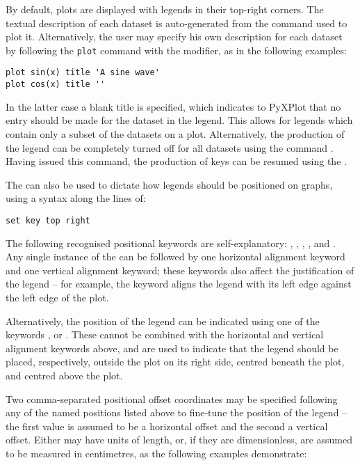 By default, plots are displayed with legends in their top-right corners. The
textual description of each dataset is auto-generated from the command used
to plot it. Alternatively, the user may specify his own description for each
dataset by following the {\tt plot} command with the  modifier,
as in the following examples:

\begin{verbatim}
plot sin(x) title 'A sine wave'
plot cos(x) title ''
\end{verbatim}

In the latter case a blank title is specified, which indicates to PyXPlot that
no entry should be made for the dataset in the legend. This allows for legends
which contain only a subset of the datasets on a plot. Alternatively, the
production of the legend can be completely turned off for all datasets using
the command . Having issued this command, the production of
keys can be resumed using the .

The  can also be used to dictate how legends should be
positioned on graphs, using a syntax along the lines of:

\begin{verbatim}
set key top right
\end{verbatim}

The following recognised positional keywords are self-explanatory:
, , , ,
 and . Any single instance of the
 can be followed by one horizontal alignment keyword and one
vertical alignment keyword; these keywords also affect the justification of the
legend -- for example, the keyword  aligns the legend with its
left edge against the left edge of the plot.

Alternatively, the position of the legend can be indicated using one of the
keywords ,  or . These cannot be
combined with the horizontal and vertical alignment keywords above, and are
used to indicate that the legend should be placed, respectively, outside the
plot on its right side, centred beneath the plot, and centred above the plot.

Two comma-separated positional offset coordinates may be specified following
any of the named positions listed above to fine-tune the position of the legend
-- the first value is assumed to be a horizontal offset and the second a
vertical offset. Either may have units of length, or, if they are
dimensionless, are assumed to be measured in centimetres, as the following
examples demonstrate:

